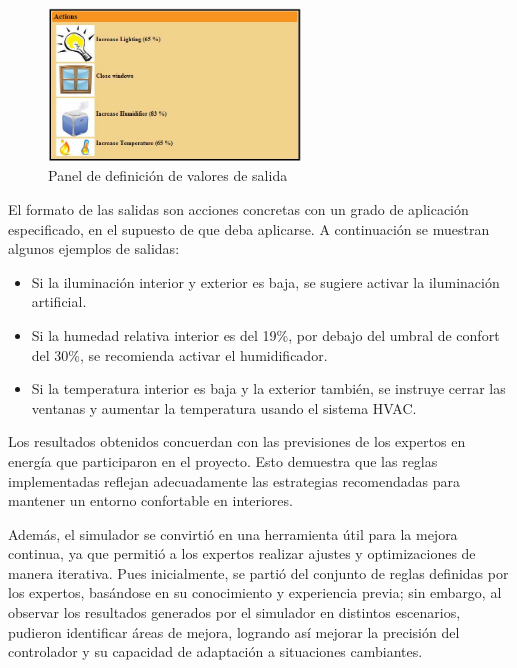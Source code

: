 \begin{enumerate}
	\begin{figure}[H]
		\centering
		\includegraphics[width=0.6\textwidth]{imgs/simulator-actions-output.JPG}
		\caption{Panel de definición de valores de salida}
		\label{fig:simulator-actions-output}
	\end{figure}
	
	El formato de las salidas son acciones concretas con un grado de aplicación especificado, en el supuesto de que deba aplicarse. A continuación se muestran algunos ejemplos de salidas:
	
	\begin{itemize}
		\item Si la iluminación interior y exterior es baja, se sugiere activar la iluminación artificial.
		\item Si la humedad relativa interior es del 19\%, por debajo del umbral de confort del 30\%, se recomienda activar el humidificador.
		\item Si la temperatura interior es baja y la exterior también, se instruye cerrar las ventanas y aumentar la temperatura usando el sistema HVAC.
	\end{itemize}
	
\end{enumerate}

Los resultados obtenidos concuerdan con las previsiones de los expertos en energía que participaron en el proyecto. Esto demuestra que las reglas implementadas reflejan adecuadamente las estrategias recomendadas para mantener un entorno confortable en interiores. 

Además, el simulador se convirtió en una herramienta útil para la mejora continua, ya que permitió a los expertos realizar ajustes y optimizaciones de manera iterativa. Pues inicialmente, se partió del conjunto de reglas definidas por los expertos, basándose en su conocimiento y experiencia previa; sin embargo, al observar los resultados generados por el simulador en distintos escenarios, pudieron identificar áreas de mejora, logrando así mejorar la precisión del controlador y su capacidad de adaptación a situaciones cambiantes. 

